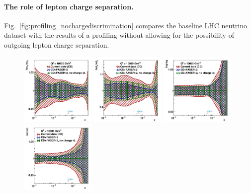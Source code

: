 \paragraph{The role of lepton charge separation.}
%
Fig.~\ref{fig:profiling_nochargediscrimination} compares the baseline LHC neutrino dataset with the results
of a profiling without allowing for the possibility of outgoing lepton charge separation.
\begin{figure}[t]
\centering
\includegraphics[width=0.32\textwidth]{plots/proton_fasernu2/nochargediscrimination/statOnly_FASERv2_q2_10000_pdf_uv_ratio.pdf}
\includegraphics[width=0.32\textwidth]{plots/proton_fasernu2/nochargediscrimination/statOnly_FASERv2_q2_10000_pdf_dv_ratio.pdf}
\includegraphics[width=0.32\textwidth]{plots/proton_fasernu2/nochargediscrimination/statOnly_FASERv2_q2_10000_pdf_g_ratio.pdf}\\
\includegraphics[width=0.32\textwidth]{plots/proton_fasernu2/nochargediscrimination/statOnly_FASERv2_q2_10000_pdf_Sea_ratio.pdf}

\end{figure}
